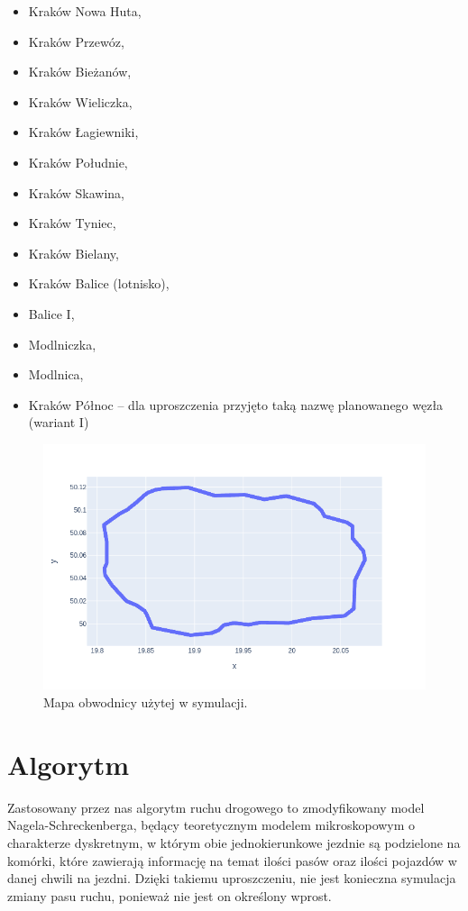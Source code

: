 \documentclass[a4paper,12pt]{article}
\begin{document}
	\begin{itemize}
		\item Kraków Nowa Huta,
		\item Kraków Przewóz,
		\item Kraków Bieżanów,
		\item Kraków Wieliczka,
		\item Kraków Łagiewniki,
		\item Kraków Południe,
		\item Kraków Skawina,
		\item Kraków Tyniec,
		\item Kraków Bielany,
		\item Kraków Balice (lotnisko),
		\item Balice I,
		\item Modlniczka,
		\item Modlnica,
		\item Kraków Północ -- dla uproszczenia przyjęto taką nazwę planowanego węzła (wariant I)
	\end{itemize}

	\begin{figure}[H]
		\centering
		\includegraphics[width=\textwidth]{img/note-map.png}
		\caption{Mapa obwodnicy użytej w symulacji.}
	\end{figure}

    \section{Algorytm}
    Zastosowany przez nas algorytm ruchu drogowego to zmodyfikowany model Nagela-Schreckenberga, będący teoretycznym modelem mikroskopowym o charakterze dyskretnym, w którym obie jednokierunkowe jezdnie są podzielone na komórki, które zawierają informację na temat ilości pasów oraz ilości pojazdów w danej chwili na jezdni. Dzięki takiemu uproszczeniu, nie jest konieczna symulacja zmiany pasu ruchu, ponieważ nie jest on określony wprost.
    
\end{document}

